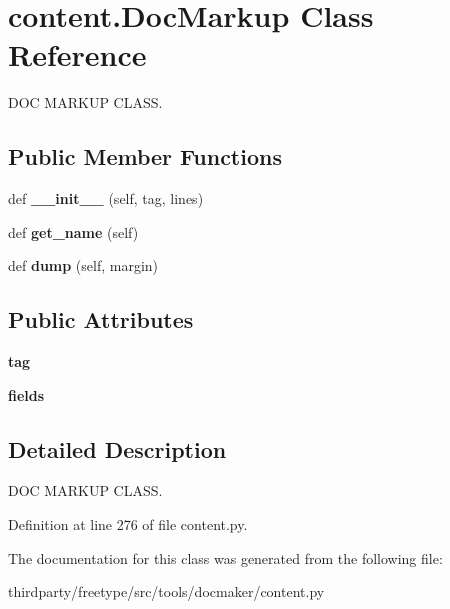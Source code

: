 \hypertarget{classcontent_1_1_doc_markup}{}\section{content.\+Doc\+Markup Class Reference}
\label{classcontent_1_1_doc_markup}


D\+OC M\+A\+R\+K\+UP C\+L\+A\+SS.  


\subsection*{Public Member Functions}
\begin{DoxyCompactItemize}
\item 
\mbox{\label{classcontent_1_1_doc_markup_a29288149fdba6e4869e72b78c303631e}} 
def {\bfseries \+\_\+\+\_\+init\+\_\+\+\_\+} (self, tag, lines)
\item 
\mbox{\label{classcontent_1_1_doc_markup_a9aebb4cf36988caf3c684c61d0597484}} 
def {\bfseries get\+\_\+name} (self)
\item 
\mbox{\label{classcontent_1_1_doc_markup_ab095d5586df9e8aa4e57b6855235c478}} 
def {\bfseries dump} (self, margin)
\end{DoxyCompactItemize}
\subsection*{Public Attributes}
\begin{DoxyCompactItemize}
\item 
\mbox{\label{classcontent_1_1_doc_markup_adbe62e8494f112370edde715f9ef5f3a}} 
{\bfseries tag}
\item 
\mbox{\label{classcontent_1_1_doc_markup_a66ea52dc701542dbd77dfaab4cd79dda}} 
{\bfseries fields}
\end{DoxyCompactItemize}


\subsection{Detailed Description}
D\+OC M\+A\+R\+K\+UP C\+L\+A\+SS. 

Definition at line 276 of file content.\+py.



The documentation for this class was generated from the following file\+:\begin{DoxyCompactItemize}
\item 
thirdparty/freetype/src/tools/docmaker/content.\+py\end{DoxyCompactItemize}
